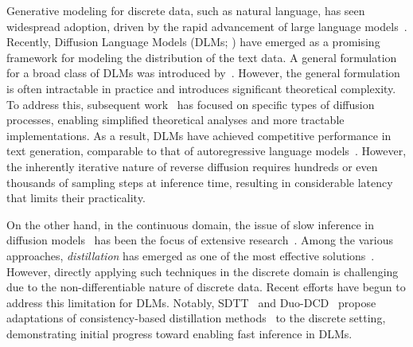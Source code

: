 Generative modeling for discrete data, such as natural language, has seen widespread adoption, driven by the rapid advancement of large language models~\citep{touvron2023llama, groeneveld2024olmo, lozhkov2024starcoder}. 
Recently, Diffusion Language Models 
(DLMs; \citealp{sohl2015deep, austin2021structured, campbell2022continuous, lou2024discrete}) have emerged as a promising framework for modeling the distribution of the text data. A general formulation for a broad class of DLMs was introduced by~\citep{lou2024discrete}. However, the general formulation is often intractable in practice and introduces significant theoretical complexity. To address this, subsequent work~\citep{sahoo2024simple, sahoo2025the, schiff2024discreteguidance, shi2024simplified} has focused on specific types of diffusion processes, enabling simplified theoretical analyses and more tractable implementations. As a result, DLMs have achieved competitive performance in text generation, comparable to that of autoregressive language models~\citep{nie2025large}. However, the inherently iterative nature of reverse diffusion requires hundreds or even thousands of sampling steps at inference time, resulting in considerable latency that limits their practicality.

On the other hand, in the continuous domain, the issue of slow inference in diffusion models~\citep{ho2020denoising, song2020score, karras2022elucidating} has been the focus of extensive research~\citep{song2020denoising, luhman2021knowledge, zhang2022fast, lu2022dpm}. Among the various approaches, \emph{distillation} has emerged as one of the most effective solutions~\citep{song2023consistency, salimans2022progressive, luhman2021knowledge, berthelot2023tract, xie2024distillation}. However, directly applying such techniques in the discrete domain is challenging due to the non-differentiable nature of discrete data. Recent efforts have begun to address this limitation for DLMs. Notably, SDTT~\citep{deschenaux2024beyond} and Duo-DCD~\citep{sahoo2025the} propose adaptations of consistency-based distillation methods~\citep{song2023consistency, song2023improved, kim2023consistency} to the discrete setting, demonstrating initial progress toward enabling fast inference in DLMs.
  

